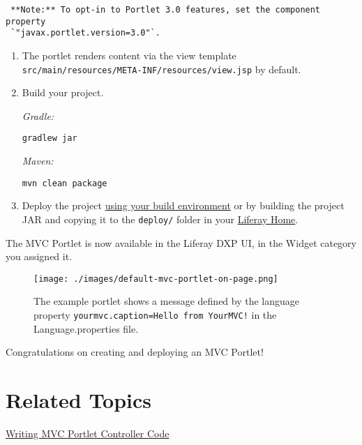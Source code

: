 \noindent\hrulefill

\begin{verbatim}
 **Note:** To opt-in to Portlet 3.0 features, set the component property
 `"javax.portlet.version=3.0"`.
\end{verbatim}

\noindent\hrulefill

\begin{enumerate}
\def\labelenumi{\arabic{enumi}.}
\setcounter{enumi}{2}
\item
  The portlet renders content via the view template
  \texttt{src/main/resources/META-INF/resources/view.jsp} by default.
\item
  Build your project.

  \emph{Gradle:}

\begin{verbatim}
gradlew jar
\end{verbatim}

  \emph{Maven:}

\begin{verbatim}
mvn clean package
\end{verbatim}
\item
  Deploy the project
  \href{/docs/7-2/reference/-/knowledge_base/r/deploying-a-project}{using
  your build environment} or by building the project JAR and copying it
  to the \texttt{deploy/} folder in your
  \href{/docs/7-2/deploy/-/knowledge_base/d/liferay-home}{Liferay Home}.
\end{enumerate}

The MVC Portlet is now available in the Liferay DXP UI, in the Widget
category you assigned it.

\begin{figure}
\centering
\texttt{[image: ./images/default-mvc-portlet-on-page.png]}
\caption{The example portlet shows a message defined by the language
property \texttt{yourmvc.caption=Hello\ from\ YourMVC!} in the
Language.properties file.}
\end{figure}

Congratulations on creating and deploying an MVC Portlet!

\section{Related Topics}\label{related-topics-3}

\href{/docs/7-2/appdev/-/knowledge_base/a/writing-mvc-portlet-controller-code}{Writing
MVC Portlet Controller Code}

